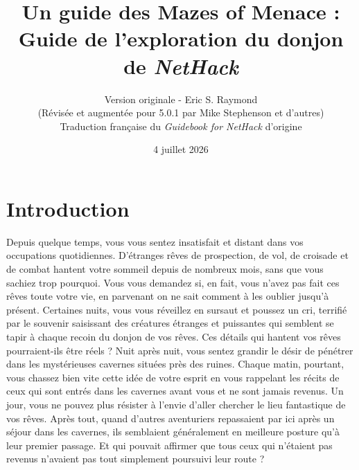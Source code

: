 \documentclass[titlepage]{article}
\begin{document}
%
%

\title{\LARGE Un guide des Mazes of Menace :\\
\Large Guide de l'exploration du donjon de \textit{NetHack}}

\author{Version originale - Eric S. Raymond\\
(Révisée et augmentée pour 5.0.1 par Mike Stephenson et d'autres)\\[2ex]
Traduction française du \textit{Guidebook for NetHack} d'origine}
\date{4 juillet 2026}

\maketitle

\section{Introduction}


Depuis quelque temps, vous vous sentez insatisfait et distant
dans vos occupations quotidiennes.  D'étranges rêves de prospection, de vol,
de croisade et de combat hantent votre sommeil depuis de nombreux mois,
sans que vous sachiez trop pourquoi.  Vous vous demandez si, en fait,
vous n'avez pas fait ces rêves toute votre vie, en parvenant on ne sait
comment à les oublier jusqu'à présent.  Certaines nuits, vous vous réveillez
en sursaut et poussez un cri, terrifié par le souvenir saisissant des
créatures étranges et puissantes qui semblent se tapir à chaque recoin du
donjon de vos rêves.  Ces détails qui hantent vos rêves pourraient-ils être réels ?
Nuit après nuit, vous sentez grandir le désir de pénétrer dans les mystérieuses
cavernes situées près des ruines.  Chaque matin, pourtant, vous chassez
bien vite cette idée de votre esprit en vous rappelant les récits de ceux qui
sont entrés dans les cavernes avant vous et ne sont jamais revenus.  Un jour,
vous ne pouvez plus résister à l'envie d'aller chercher le lieu fantastique
de vos rêves.
Après tout, quand d'autres aventuriers repassaient par ici après un séjour
dans les cavernes, ils semblaient généralement en meilleure posture qu'à
leur premier passage.  Et qui pouvait affirmer que tous ceux qui n'étaient
pas revenus n'avaient pas tout simplement poursuivi leur route ?
\end{document}

